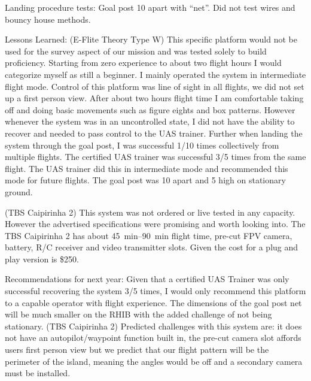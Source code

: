 Landing procedure tests: Goal post \SI{10}{\foot} apart with ``net''. Did not test wires and bouncy house methods. 

Lessons Learned: (E-Flite Theory Type W) This specific platform would not be used for the survey aspect of our mission and was tested solely to build proficiency. Starting from zero experience to about two flight hours I would categorize myself as still a beginner. I mainly operated the system in intermediate flight mode. Control of this platform was line of sight in all flights, we did not set up a first person view. After about two hours flight time I am comfortable taking off and doing basic movements such as figure eights and box patterns. However whenever the system was in an uncontrolled state, I did not have the ability to recover and needed to pass control to the UAS trainer. Further when landing the system through the goal post, I was successful 1/10 times collectively from multiple flights. The certified UAS trainer was successful 3/5 times from the same flight. The UAS trainer did this in intermediate mode and recommended this mode for future flights. The goal post was \SI{10}{\foot} apart and \SI{5}{\foot} high on stationary ground. 

(TBS Caipirinha 2) This system was not ordered or live tested in any capacity. However the advertised specifications were promising and worth looking into. The TBS Caipirinha 2 has about \SIrange{45}{90}{\minute} flight time, pre-cut FPV camera, battery, R/C receiver and video transmitter slots. Given the cost for a plug and play version is \$250.

Recommendations for next year: Given that a certified UAS Trainer was only successful recovering the system 3/5 times, I would only recommend this platform to a capable operator with flight experience. The dimensions of the goal post net will be much smaller on the RHIB with the added challenge of not being stationary. (TBS Caipirinha 2) Predicted challenges with this system are: it does not have an autopilot/waypoint function built in, the pre-cut camera slot affords users first person view but we predict that our flight pattern will be the perimeter of the island, meaning the angles would be off and a secondary camera must be installed.







